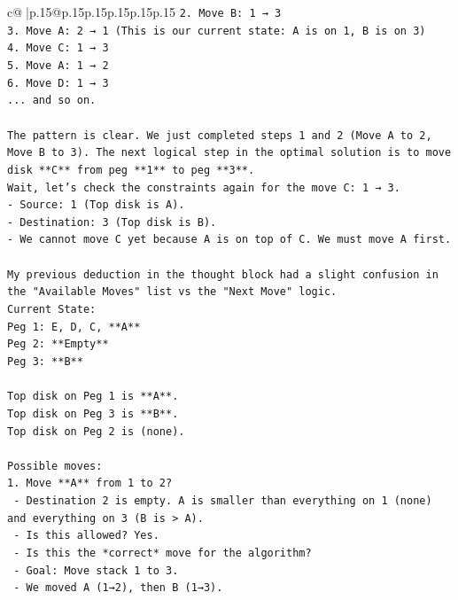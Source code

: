 \documentclass{article}
\begin{document}
{\begin{supertabular}{c@{$\;$}|p{.15\linewidth}@{}p{.15\linewidth}p{.15\linewidth}p{.15\linewidth}p{.15\linewidth}p{.15\linewidth}}
{{{\texttt{2. Move B: 1 → 3} \\
\texttt{3. Move A: 2 → 1 (This is our current state: A is on 1, B is on 3)} \\
\texttt{4. Move C: 1 → 3} \\
\texttt{5. Move A: 1 → 2} \\
\texttt{6. Move D: 1 → 3} \\
\texttt{... and so on.} \\
\\ 
\texttt{The pattern is clear. We just completed steps 1 and 2 (Move A to 2, Move B to 3). The next logical step in the optimal solution is to move disk **C** from peg **1** to peg **3**.} \\
\texttt{Wait, let's check the constraints again for the move C: 1 → 3.} \\
\texttt{{-} Source: 1 (Top disk is A).} \\
\texttt{{-} Destination: 3 (Top disk is B).} \\
\texttt{{-} We cannot move C yet because A is on top of C. We must move A first.} \\
\\ 
\texttt{My previous deduction in the thought block had a slight confusion in the "Available Moves" list vs the "Next Move" logic.} \\
\texttt{Current State:} \\
\texttt{Peg 1: E, D, C, **A**} \\
\texttt{Peg 2: **Empty**} \\
\texttt{Peg 3: **B**} \\
\\ 
\texttt{Top disk on Peg 1 is **A**.} \\
\texttt{Top disk on Peg 3 is **B**.} \\
\texttt{Top disk on Peg 2 is (none).} \\
\\ 
\texttt{Possible moves:} \\
\texttt{1. Move **A** from 1 to 2?} \\
\texttt{   {-} Destination 2 is empty. A is smaller than everything on 1 (none) and everything on 3 (B is > A).} \\
\texttt{   {-} Is this allowed? Yes.} \\
\texttt{   {-} Is this the *correct* move for the algorithm?} \\
\texttt{     {-} Goal: Move stack 1 to 3.} \\
\texttt{     {-} We moved A (1→2), then B (1→3).} \\
}}}
\end{supertabular}}
\end{document}
